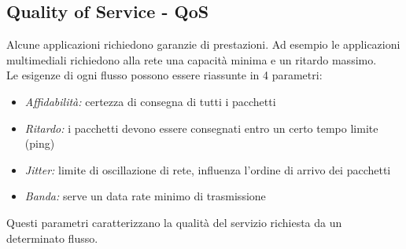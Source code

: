 \documentclass[10pt,a4paper,twoside]{article}
\begin{document}
\subsection{Quality of Service - QoS}
Alcune applicazioni richiedono garanzie di prestazioni. Ad esempio le applicazioni multimediali richiedono alla rete una capacità minima e un ritardo massimo.\\
Le esigenze di ogni flusso possono essere riassunte in 4 parametri:
\begin{itemize}
\item \textit{Affidabilità:} certezza di consegna di tutti i pacchetti
\item \textit{Ritardo:} i pacchetti devono essere consegnati entro un certo tempo limite (ping)
\item \textit{Jitter:} limite di oscillazione di rete, influenza l'ordine di arrivo dei pacchetti
\item \textit{Banda:} serve un data rate minimo di trasmissione
\end{itemize}
Questi parametri caratterizzano la qualità del servizio richiesta da un determinato flusso.
\end{document}
